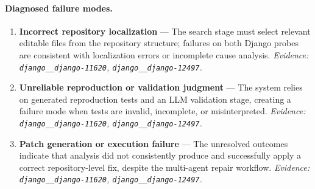 \paragraph{Diagnosed failure modes.}\begin{enumerate}\itemsep1pt
\item \textbf{Incorrect repository localization} --- The search stage must select relevant editable files from the repository structure; failures on both Django probes are consistent with localization errors or incomplete cause analysis. \emph{Evidence: \texttt{django\_\_django-11620}, \texttt{django\_\_django-12497}.}
\item \textbf{Unreliable reproduction or validation judgment} --- The system relies on generated reproduction tests and an LLM validation stage, creating a failure mode when tests are invalid, incomplete, or misinterpreted. \emph{Evidence: \texttt{django\_\_django-11620}, \texttt{django\_\_django-12497}.}
\item \textbf{Patch generation or execution failure} --- The unresolved outcomes indicate that analysis did not consistently produce and successfully apply a correct repository-level fix, despite the multi-agent repair workflow. \emph{Evidence: \texttt{django\_\_django-11620}, \texttt{django\_\_django-12497}.}
\end{enumerate}
